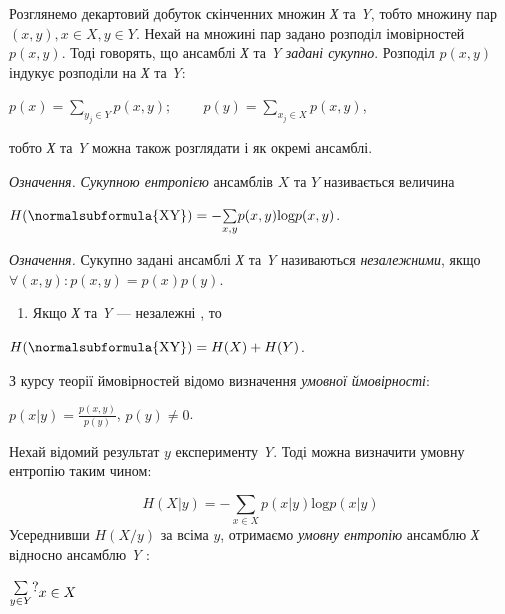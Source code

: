 \bigskip

Розглянемо декартовий добуток скінченних множин \textit{Х} та \textit{Y}, тобто
множину пар  ${(x,y),x\in X,y\in Y}$. Нехай на множині пар задано розподіл
імовірностей  ${p(x,y)}$. Тоді говорять, що ансамблі \textit{Х} та \textit{Y}
\textit{задані сукупно}. Розподіл  ${p(x,y)}$ індукує розподіли на \textit{Х}
та \textit{Y}:

{\centering
 ${p(x)=\underset{{y_{{j}}\in Y}}{\sum
}{p(x,y)};\;\;\;\;\;\;\;\;p(y)=\underset{x_{{j}}\in X}{\sum }{p(x,y)}}$,
\par}

тобто \textit{Х} та \textit{Y} можна також розглядати і як окремі ансамблі.

\textit{Означення.} \textit{Сукупною ентропією} ансамблів  ${X}$ та  ${Y}$
називається величина

{\centering
 ${H(\normalsubformula{\text{XY}})=-\underset{{x,y}}{\sum
}{p(x,y)\text{log}p(x,y)}}$.
\par}

\textit{Означення.} Сукупно задані ансамблі \textit{Х} та \textit{Y} називаються
\textit{незалежними}, якщо  ${\forall (x,y):p(x,y)=p(x)p(y)}$.

\liststyleWWviiiNumxxxix
\setcounter{saveenum}{\value{enumi}}
\begin{enumerate}
\setcounter{enumi}{\value{saveenum}}
\item Якщо \textit{Х} та \textit{Y} --- незалежні , то
\end{enumerate}
{\centering
 ${H(\normalsubformula{\text{XY}})=H(X)+H(Y)}$.
\par}

З курсу теорії ймовірностей відомо визначення \textit{умовної ймовірності}:

{\centering
 ${p\left(x|y\right)=\frac{p(x,y)}{p(y)}}$,   ${p(y)\neq 0}$.
\par}

Нехай відомий результат  ${y}$ експерименту \textit{Y}. Тоді можна визначити
умовну ентропію таким чином:

\begin{equation*}
{H\left(X|y\right)=-\underset{{x\in X}}{\sum
}{p\left(x|y\right)\text{log}p\left(x|y\right)}}
\end{equation*}
Усереднивши  ${H(X/y)}$ за всіма  ${y}$, отримаємо \textit{умовну ентропію}
ансамблю  \textit{Х } відносно ансамблю \textit{Y} :

 $\begin{matrix}\underset{{y\in Y}}{\sum }?\hfill\null \end{matrix}{x\in
X}\hfill $

